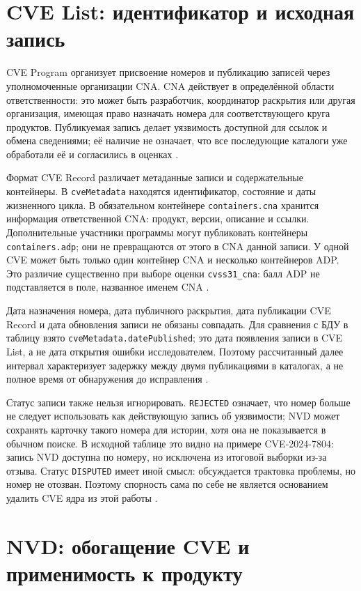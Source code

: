 \documentclass[12pt,a4paper]{report}
\begin{document}
\section{CVE List: идентификатор и исходная запись}

CVE Program организует присвоение номеров и публикацию записей через уполномоченные организации CNA. CNA действует в определённой области ответственности: это может быть разработчик, координатор раскрытия или другая организация, имеющая право назначать номера для соответствующего круга продуктов. Публикуемая запись делает уязвимость доступной для ссылок и обмена сведениями; её наличие не означает, что все последующие каталоги уже обработали её и согласились в оценках \cite{cverules,cve}.

Формат CVE Record различает метаданные записи и содержательные контейнеры. В \texttt{cveMetadata} находятся идентификатор, состояние и даты жизненного цикла. В обязательном контейнере \texttt{containers.cna} хранится информация ответственной CNA: продукт, версии, описание и ссылки. Дополнительные участники программы могут публиковать контейнеры \texttt{containers.adp}; они не превращаются от этого в CNA данной записи. У одной CVE может быть только один контейнер CNA и несколько контейнеров ADP. Это различие существенно при выборе оценки \texttt{cvss31\_cna}: балл ADP не подставляется в поле, названное именем CNA \cite{cveschema}.

Дата назначения номера, дата публичного раскрытия, дата публикации CVE Record и дата обновления записи не обязаны совпадать. Для сравнения с БДУ в таблицу взято \texttt{cveMetadata.datePublished}; это дата появления записи в CVE List, а не дата открытия ошибки исследователем. Поэтому рассчитанный далее интервал характеризует задержку между двумя публикациями в каталогах, а не полное время от обнаружения до исправления \cite{cveschema}.

Статус записи также нельзя игнорировать. \texttt{REJECTED} означает, что номер больше не следует использовать как действующую запись об уязвимости; NVD может сохранять карточку такого номера для истории, хотя она не показывается в обычном поиске. В исходной таблице это видно на примере CVE-2024-7804: запись NVD доступна по номеру, но исключена из итоговой выборки из-за отзыва. Статус \texttt{DISPUTED} имеет иной смысл: обсуждается трактовка проблемы, но номер не отозван. Поэтому спорность сама по себе не является основанием удалить CVE ядра из этой работы \cite{nvdstatus,cverules}.

\section{NVD: обогащение CVE и применимость к продукту}
\end{document}
